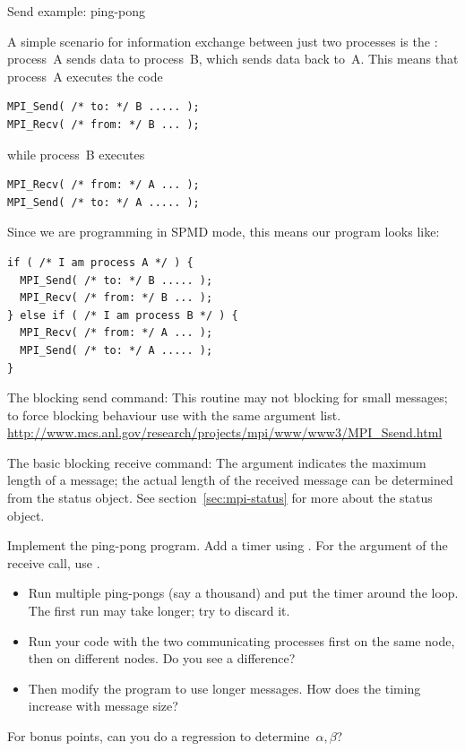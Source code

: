  {Send example: ping-pong}
\label{sec:mpi-send-recv}

A simple scenario for information exchange between just two processes
is the : process~A sends data to process~B, which
sends data back to~A. This means that process~A executes the code
\begin{lstlisting}
MPI_Send( /* to: */ B ..... );
MPI_Recv( /* from: */ B ... );
\end{lstlisting}
while process~B executes
\begin{lstlisting}
MPI_Recv( /* from: */ A ... );
MPI_Send( /* to: */ A ..... );
\end{lstlisting}
Since we are programming in SPMD mode, this means our program looks like:
\begin{lstlisting}
if ( /* I am process A */ ) {
  MPI_Send( /* to: */ B ..... );
  MPI_Recv( /* from: */ B ... );
} else if ( /* I am process B */ ) {
  MPI_Recv( /* from: */ A ... );
  MPI_Send( /* to: */ A ..... );
}
\end{lstlisting}

The blocking send command:
%
%
This routine may not blocking for small messages; to force blocking
behaviour use  with the same argument list.
\url{http://www.mcs.anl.gov/research/projects/mpi/www/www3/MPI_Ssend.html}

The basic blocking receive command:
%
%
The  argument indicates the maximum length of a message; the
actual length of the received message can be determined 
from the status object. See section~\ref{sec:mpi-status}
for more about the status object.

\begin{exercise}
  \label{ex:pingpong}
  Implement the ping-pong program. Add a timer using .
  For the  argument of the receive call, use
  .

  \begin{itemize}
  \item Run multiple ping-pongs (say a thousand) and put the timer
    around the loop. The first run may take longer; try to discard it.
  \item Run your code with the two communicating processes first on
    the same node, then on different nodes. Do you see a difference?
  \item Then modify the program
    to use longer messages. How does the timing increase with message size?
  \end{itemize}
  For bonus points, can you do a regression to determine~$\alpha,\beta$?
\end{exercise}

